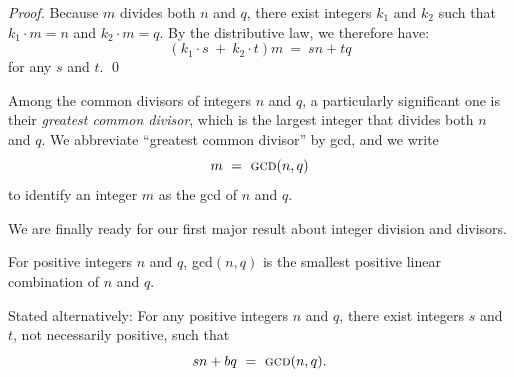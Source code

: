 \begin{proof}
Because $m$ divides both $n$ and $q$, there exist integers $k_1$ and $k_2$ such that $k_1 \cdot m = n$ and $k_2 \cdot m = q$.  By the distributive law, we therefore have:
\[ (k_1 \cdot s \ + \ k_2 \cdot t)m \ = \ sn+tq \]
for any $s$ and $t$.  \qed
\end{proof}

 
Among the common divisors of integers $n$ and $q$, a particularly significant one is their {\em greatest common divisor}, which is the largest integer that divides both $n$ and $q$.  We abbreviate ``greatest common divisor'' by {\sc gcd}, and we write
\[ m \ = \ \mbox{\sc gcd}(n, q) \]
to identify an integer $m$ as the {\sc gcd} of $n$ and $q$.

\smallskip

We are finally ready for our first major result about integer division and divisors.

\begin{prop}
\label{thm:gcd-n-linear}
For positive integers $n$ and $q$, {\sc gcd}$(n, q)$ is the smallest positive linear combination of $n$ and $q$.

\noindent
Stated alternatively: For any positive integers $n$ and $q$, there exist integers $s$ and $t$, not necessarily positive, such that
\[ sn + bq \ = \ \mbox{\sc gcd}(n, q). \]
\end{prop}

